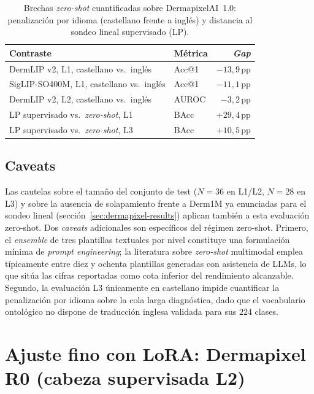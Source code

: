 \begin{table}[H]
\centering
\footnotesize
\setlength{\tabcolsep}{4pt}
\renewcommand{\arraystretch}{0.95}
\caption{Brechas \emph{zero-shot} cuantificadas sobre DermapixelAI~1.0:
penalización por idioma (castellano frente a inglés) y distancia al
sondeo lineal supervisado (LP).}
\label{tab:dermapixel-zs-gaps}
\begin{tabular}{llr}
\hline
Contraste                                & Métrica & \emph{Gap} \\
\hline
DermLIP v2, L1, castellano vs.\ inglés   & Acc@1 & $-13{,}9$\,pp \\
SigLIP-SO400M, L1, castellano vs.\ inglés & Acc@1 & $-11{,}1$\,pp \\
DermLIP v2, L2, castellano vs.\ inglés   & AUROC & $-3{,}2$\,pp \\
LP supervisado vs.\ \emph{zero-shot}, L1 & BAcc  & $+29{,}4$\,pp \\
LP supervisado vs.\ \emph{zero-shot}, L3 & BAcc  & $+10{,}5$\,pp \\
\hline
\end{tabular}
\end{table}

\subsection*{Caveats}

Las cautelas sobre el tamaño del conjunto de test ($N = 36$ en
L1/L2, $N = 28$ en L3) y sobre la ausencia de solapamiento frente
a Derm1M ya enunciadas para el sondeo lineal
(sección~\ref{sec:dermapixel-results}) aplican también a esta
evaluación zero-shot. Dos \emph{caveats} adicionales son
específicos del régimen zero-shot. Primero, el \emph{ensemble} de
tres plantillas textuales por nivel constituye una formulación
mínima de \emph{prompt engineering}; la literatura sobre
\emph{zero-shot} multimodal emplea típicamente entre diez y ochenta
plantillas generadas con asistencia de LLMs, lo que sitúa las
cifras reportadas como cota inferior del rendimiento alcanzable.
Segundo, la evaluación L3 únicamente en castellano impide
cuantificar la penalización por idioma sobre la cola larga
diagnóstica, dado que el vocabulario ontológico no dispone de
traducción inglesa validada para sus $224$ clases.

\section{Ajuste fino con LoRA: Dermapixel R0 (cabeza supervisada L2)}
\label{sec:dermapixel-spanderm-v0}

